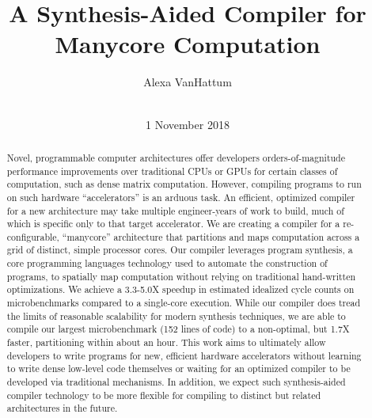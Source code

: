 \documentclass{sig-alternate-05-2015}
\begin{document}

\title{A Synthesis-Aided Compiler for Manycore Computation}

\author{
\alignauthor
Alexa VanHattum\\
       \\
}
\date{1 November 2018}

\maketitle

\begin{abstract}

Novel, programmable computer architectures offer developers orders-of-magnitude performance improvements over traditional CPUs or GPUs for certain classes of computation, such as dense matrix computation. However, compiling programs to run on such hardware ``accelerators'' is an arduous task. An efficient, optimized compiler for a new architecture may take multiple engineer-years of work to build, much of which is specific only to that target accelerator. We are creating a compiler for a re-configurable, ``manycore'' architecture that partitions and maps computation across a grid of distinct, simple processor cores. Our compiler leverages program synthesis, a core programming languages technology used to automate the construction of programs, to spatially map computation without relying on traditional hand-written optimizations. We achieve a 3.3-5.0X speedup in estimated idealized cycle counts on microbenchmarks compared to a single-core execution. While our compiler does tread the limits of reasonable scalability for modern synthesis techniques, we are able to compile our largest microbenchmark (152 lines of code) to a non-optimal, but 1.7X faster, partitioning within  about an hour. This work aims to ultimately allow developers to write programs for new, efficient hardware accelerators without learning to write dense low-level code themselves or waiting for an optimized compiler to be developed via traditional mechanisms. In addition, we expect such synthesis-aided compiler technology to be more flexible for compiling to distinct but related architectures in the future.

\end{abstract}
\end{document}
